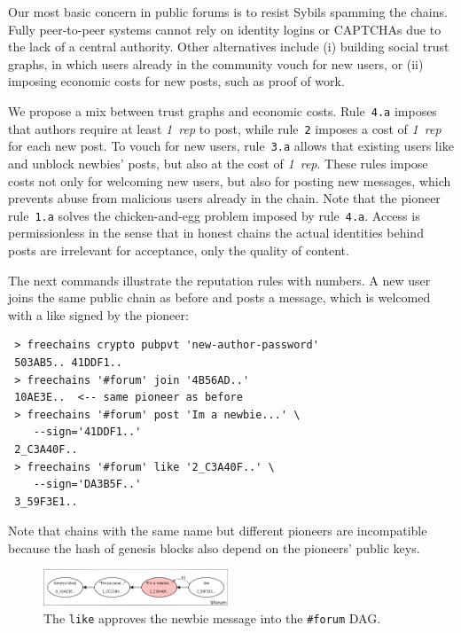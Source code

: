 \documentclass[10pt,journal,compsoc]{IEEEtran}
\newcommand{\onerep}   {\emph{1~rep}\xspace}
\begin{document}
Our most basic concern in public forums is to resist Sybils spamming the
chains.
Fully peer-to-peer systems cannot rely on identity logins or CAPTCHAs due
to the lack of a central authority.
Other alternatives include (i) building social trust graphs, in which users
already in the community vouch for new users, or (ii) imposing economic costs
for new posts, such as proof of work.

We propose a mix between trust graphs and economic costs.
Rule~\texttt{4.a} imposes that authors require at least \onerep to post, while
rule~\texttt{2} imposes a cost of \onerep for each new post.
To vouch for new users, rule~\texttt{3.a} allows that existing users like and
unblock newbies' posts, but also at the cost of \onerep.
These rules impose costs not only for welcoming new users, but also for posting
new messages, which prevents abuse from malicious users already in the chain.
%
Note that the pioneer rule~\texttt{1.a} solves the chicken-and-egg problem
imposed by rule~\texttt{4.a}.
%
Access is permissionless in the sense that in honest chains the actual
identities behind posts are irrelevant for acceptance, only the quality of
content.

The next commands illustrate the reputation rules with numbers.
A new user joins the same public chain as before and posts a message, which is
welcomed with a like signed by the pioneer:

{\footnotesize
\begin{verbatim}
 > freechains crypto pubpvt 'new-author-password'
 503AB5.. 41DDF1..
 > freechains '#forum' join '4B56AD..'
 10AE3E..  <-- same pioneer as before
 > freechains '#forum' post 'Im a newbie...' \
    --sign='41DDF1..'
 2_C3A40F..
 > freechains '#forum' like '2_C3A40F..' \
    --sign='DA3B5F..'
 3_59F3E1..
\end{verbatim}
}

Note that chains with the same name but different pioneers are incompatible
because the hash of genesis blocks also depend on the pioneers' public keys.

\begin{figure}
\centering
\includegraphics[width=0.49\textwidth]{forum.png}
\caption{
    The \texttt{like} approves the newbie message into the \texttt{\#forum} DAG.
}
\label{fig.forum}
\end{figure}
\end{document}
